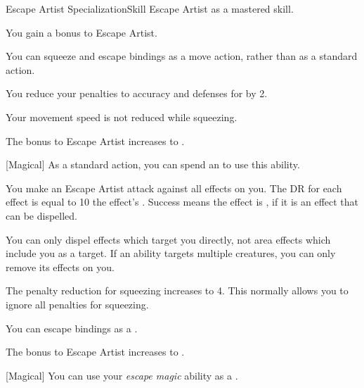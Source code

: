     \begin{feat}{Escape Artist Specialization}{Skill}
        \featpre Escape Artist as a mastered skill.
        \featben

         You gain a  bonus to Escape Artist.

         You can squeeze and escape bindings as a move action, rather than as a standard action.

         You reduce your penalties to accuracy and defenses for  by 2.

         Your movement speed is not reduced while squeezing.

         The bonus to Escape Artist increases to .

        [Magical] As a standard action, you can spend an  to use this ability.
        \begin{ability}
            \begin{spelleffects}
                \spelleffect You make an Escape Artist attack against all  effects on you.
                The DR for each effect is equal to 10 \add the effect's .
                Success means the effect is , if it is an effect that can be dispelled.
                \par You can only dispel effects which target you directly, not area effects which include you as a target.
                If an ability targets multiple creatures, you can only remove its effects on you.
            \end{spelleffects}
        \end{ability}

         The penalty reduction for squeezing increases to 4.
        This normally allows you to ignore all penalties for squeezing.

         You can escape bindings as a .

         The bonus to Escape Artist increases to .

        [Magical] You can use your \textit{escape magic} ability as a .
    \end{feat}

